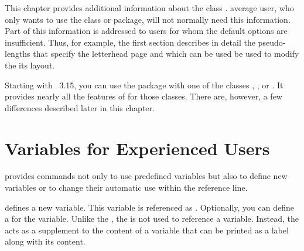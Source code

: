 \BeginIndexGroup
{}
This chapter provides additional information about the \KOMAScript{} class
.  average user, who only wants to use the class
or package, will not normally need this information. Part of this information
is addressed to users for whom the default options are insufficient. Thus,
for example, the first section describes in detail the pseudo-lengths that
specify the letterhead page and which can be used be used to modify the its
layout.%
\iffalse%
  In addition, this chapter also describes features that exist only to
  provide compatibility with the deprecated \Class{scrlettr} class. It also
  explains in detail how to convert a document from this obsolete class
  to the current  class.
\fi

%
Starting with \KOMAScript~3.15,
you can use the  package with one of the \KOMAScript{}
classes , , or . It provides
nearly all the features of  for those classes. There are,
however, a few differences described later in this chapter.%


\section{Variables for Experienced Users}
\BeginIndexGroup
{}

\KOMAScript{} provides commands not only to use predefined variables but also
to define new variables or to change their automatic use within the reference
line.

\begin{Declaration}
\end{Declaration}
 defines a new variable. This variable is referenced as
. Optionally, you can define a  for the
 variable. Unlike the , the  is not
used to reference a variable. Instead, the  acts as a
supplement to the content of a variable that can be printed as a label along
with its content.

